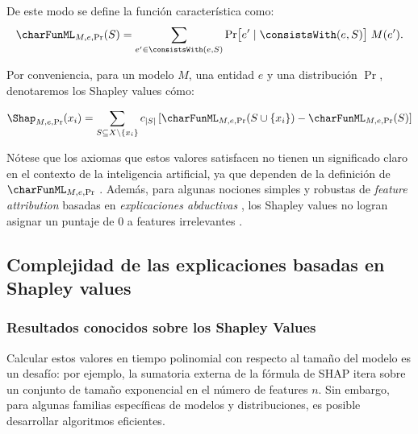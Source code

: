 
De este modo se define la función característica como:
\begin{align} \label{formula:characteristicFunctionDefinition}
	\charFunML_{M,e,\Pr}(S)
	= \sum_{e'\in\consistsWith(e,S)}
	\Pr\bigl[e'\mid\consistsWith(e,S)\bigr]\;M(e').    
\end{align}


Por conveniencia, para un modelo \(M\), una entidad \(e\) y una distribución \(\Pr\), denotaremos los Shapley values cómo:

\[
\Shap_{M,e,\Pr}(x_i) = \sum_{S \subseteq X \setminus \{x_i\}} c_{|S|} \left[ \charFunML_{M,e,\Pr}(S \cup \{x_i\}) - \charFunML_{M,e,\Pr}(S) \right]
\]



Nótese que los axiomas que estos valores satisfacen no tienen un significado claro en el contexto de la inteligencia artificial, ya que dependen de la definición de \(\charFunML_{M,e,\Pr}\) \cite{fryer2021shapley}. Además, para algunas nociones simples y robustas de \textit{feature attribution} basadas en \textit{explicaciones abductivas} \cite{marques2023logic}, los Shapley values no logran asignar un puntaje de 0 a features irrelevantes \cite{huang2023inadequacy}.

\subsection{Complejidad de las explicaciones basadas en Shapley values}

\subsubsection{Resultados conocidos sobre los Shapley Values}

Calcular estos valores en tiempo polinomial con respecto al tamaño del modelo es un desafío: por ejemplo, la sumatoria externa de la fórmula de SHAP itera sobre un conjunto de tamaño exponencial en el número de features \(n\). Sin embargo, para algunas familias específicas de modelos y distribuciones, es posible desarrollar algoritmos eficientes.

